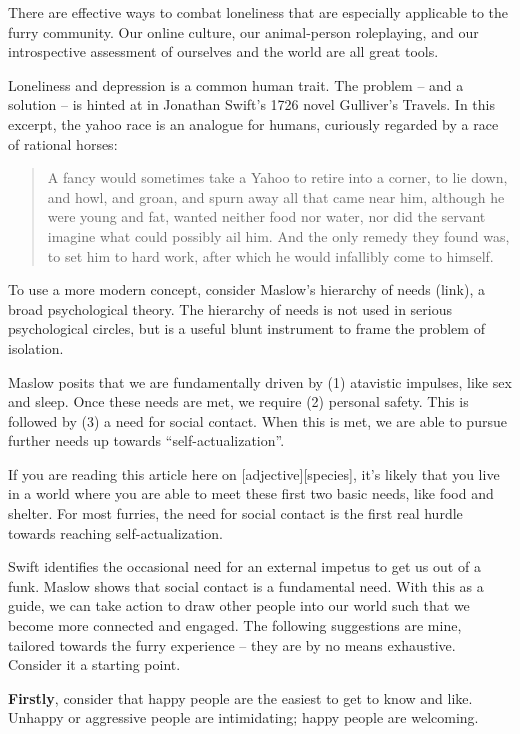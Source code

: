There are effective ways to combat loneliness that are especially applicable to the furry community. Our online culture, our animal-person roleplaying, and our introspective assessment of ourselves and the world are all great tools.

Loneliness and depression is a common human trait. The problem -- and a solution -- is hinted at in Jonathan Swift's 1726 novel Gulliver's Travels. In this excerpt, the yahoo race is an analogue for humans, curiously regarded by a race of rational horses:

\begin{quote}
  A fancy would sometimes take a Yahoo to retire into a corner, to lie down, and howl, and groan, and spurn away all that came near him, although he were young and fat, wanted neither food nor water, nor did the servant imagine what could possibly ail him. And the only remedy they found was, to set him to hard work, after which he would infallibly come to himself.
\end{quote}

To use a more modern concept, consider Maslow's hierarchy of needs (link), a broad psychological theory. The hierarchy of needs is not used in serious psychological circles, but is a useful blunt instrument to frame the problem of isolation.

Maslow posits that we are fundamentally driven by (1) atavistic impulses, like sex and sleep. Once these needs are met, we require (2) personal safety. This is followed by (3) a need for social contact. When this is met, we are able to pursue further needs up towards ``self-actualization''.

If you are reading this article here on [adjective][species], it's likely that you live in a world where you are able to meet these first two basic needs, like food and shelter. For most furries, the need for social contact is the first real hurdle towards reaching self-actualization.

Swift identifies the occasional need for an external impetus to get us out of a funk. Maslow shows that social contact is a fundamental need. With this as a guide, we can take action to draw other people into our world such that we become more connected and engaged. The following suggestions are mine, tailored towards the furry experience -- they are by no means exhaustive. Consider it a starting point.

\textbf{Firstly}, consider that happy people are the easiest to get to know and like. Unhappy or aggressive people are intimidating; happy people are welcoming.

